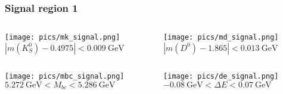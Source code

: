 \documentclass[10 pt,compress,mathserif]{beamer}
\begin{document}
\begin{frame}
 \frametitle{Signal region 1}
 \begin{small}
 \begin{columns}
  \begin{column}{0.5\textwidth}
  \begin{center}
   \texttt{[image: pics/mk\_signal.png]}\\
   $\left|m(K_S^0)-0.4975\right|<0.009\ \text{GeV}$\\
  \end{center}
  \end{column}
  \begin{column}{0.5\textwidth}
  \begin{center}
   \texttt{[image: pics/md\_signal.png]}\\
   $\left|m(D^0)-1.865\right|<0.013\ \text{GeV}$
  \end{center}
  \end{column}
 \end{columns}
 \begin{columns}
  \begin{column}{0.5\textwidth}
  \begin{center}
   \texttt{[image: pics/mbc\_signal.png]}\\
   $5.272\ \text{GeV}<M_{bc}<5.286\ \text{GeV}$\\
  \end{center}
  \end{column}
  \begin{column}{0.5\textwidth}
  \begin{center}
   \texttt{[image: pics/de\_signal.png]}\\
   $-0.08\ \text{GeV}<\Delta E<0.07\ \text{GeV}$\\
  \end{center}
  \end{column}
 \end{columns}
 \end{small}
\end{frame}
\end{document}
